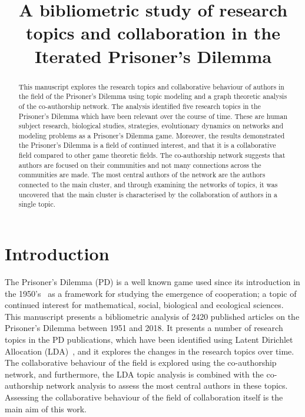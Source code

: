 \documentclass{article}
\title{A bibliometric study of research topics and collaboration
in the Iterated Prisoner's Dilemma}
\author{}
\theoremstyle{definition}
\begin{document}
\maketitle

\begin{abstract}
This manuscript explores the research topics and collaborative behaviour of
authors in the field of the Prisoner's Dilemma using topic modeling and a graph
theoretic analysis of the co-authorship network. The analysis identified five
research topics in the Prisoner's Dilemma which have been relevant over the course
of time. These are human subject research, biological studies, strategies,
evolutionary dynamics on networks and modeling problems as a Prisoner's Dilemma
game. Moreover, the results demonstrated the Prisoner's Dilemma is a field of
continued interest, and that it is a collaborative field compared to other
game theoretic fields. The co-authorship
network suggests that authors are focused on their communities and not many
connections across the communities are made. The most central authors of the network
are the authors connected to the main cluster, and through examining the networks
of topics, it was uncovered that the main cluster is characterised by the
collaboration of authors in a single topic.
\end{abstract}


\section{Introduction}\label{section:introduction}

The Prisoner's Dilemma (PD) is a well known game used since its introduction in
the 1950's~\cite{Flood1958} as a framework for studying the emergence of
cooperation; a topic of continued interest for mathematical,
social, biological and
ecological sciences. This manuscript presents a bibliometric
analysis of 2420 published articles on the Prisoner's Dilemma between 1951 and
2018. It presents a number of research topics in the PD publications, which have been
identified using Latent Dirichlet Allocation (LDA)~\cite{Blei2003}, and it explores the changes in the
research topics over time. The collaborative behaviour of the field is explored
using the co-authorship network, and furthermore, the LDA
topic analysis is combined with the co-authorship network analysis to assess
the most central authors in these topics. Assessing the collaborative
behaviour of the field of collaboration itself is the main aim of this work.
\end{document}
